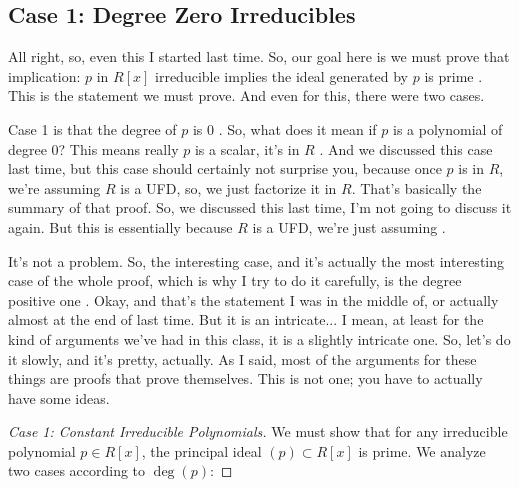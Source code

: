 \begin{proofWrapper}

\subsection{Case 1: Degree Zero Irreducibles}

\begin{speech}[00:13:52 - 00:15:33]
All right, so, even this I started last time. So, our goal here is we must prove that implication: $p$ in $R[x]$ irreducible implies the ideal generated by $p$ is prime . This is the statement we must prove. And even for this, there were two cases.

Case 1 is that the degree of $p$ is $0$ . So, what does it mean if $p$ is a polynomial of degree $0$? This means really $p$ is a scalar, it's in $R$ . And we discussed this case last time, but this case should certainly not surprise you, because once $p$ is in $R$, we're assuming $R$ is a UFD, so, we just factorize it in $R$. That's basically the summary of that proof. So, we discussed this last time, I'm not going to discuss it again. But this is essentially because $R$ is a UFD, we're just assuming .

It's not a problem. So, the interesting case, and it's actually the most interesting case of the whole proof, which is why I try to do it carefully, is the degree positive one . Okay, and that's the statement I was in the middle of, or actually almost at the end of last time. But it is an intricate... I mean, at least for the kind of arguments we've had in this class, it is a slightly intricate one. So, let's do it slowly, and it's pretty, actually. As I said, most of the arguments for these things are proofs that prove themselves. This is not one; you have to actually have some ideas.
\end{speech}

\begin{content}
\begin{proof}[Case 1: Constant Irreducible Polynomials]
We must show that for any irreducible polynomial $p \in R[x]$, the principal ideal $(p) \subset R[x]$ is prime. We analyze two cases according to $\deg(p)$:


\end{proof}
\end{content}
\end{proofWrapper}
